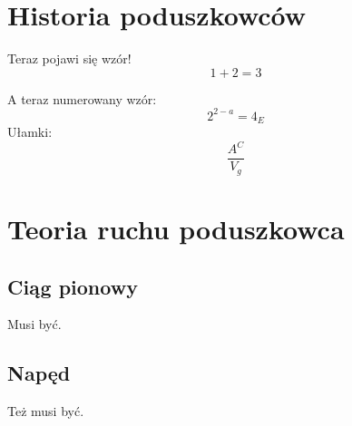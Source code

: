 \documentclass[../main/main.tex]{subfiles}
\begin{document}
\section{Historia poduszkowców}

Teraz pojawi się wzór!
$$1+2=3$$

A teraz numerowany wzór:
\begin{equation}
2^{2-a}=4_{E}
\end{equation}
Ułamki:$$\frac{A^C}{V_g}$$

\section{Teoria ruchu poduszkowca}

\subsection{Ciąg pionowy}
Musi być.
\subsection{Napęd}
Też musi być.
\end{document}
